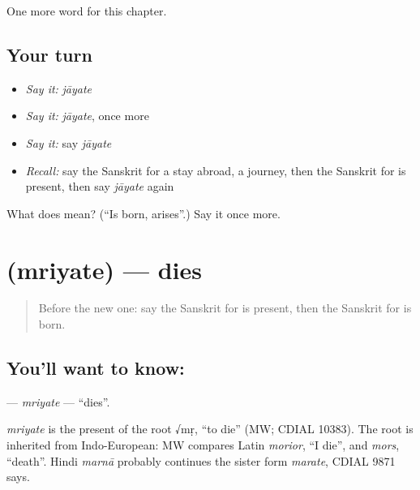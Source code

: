 \begin{grammarlens}[title={What you've built}]
One more word for this chapter.
\end{grammarlens}

\subsection*{Your turn}
\begin{itemize}
\raggedright
  \item \emph{Say it:} \emph{jāyate}
  \item \emph{Say it:} \emph{jāyate}, once more
  \item \emph{Say it:} say \emph{jāyate}
  \item \emph{Recall:} say the Sanskrit for a stay abroad, a journey, then the Sanskrit for is present, then say \emph{jāyate} again
\end{itemize}

\begin{tcolorbox}[breakable,colback=teal!4,colframe=teal!35!black,title={Before you move on}]
What does  mean? (\textquotedblleft{}Is born, arises\textquotedblright{}.) Say it once more.
\end{tcolorbox}
\section[\texorpdfstring{\sk{म्रियते} (mriyate)}{म्रियते (mriyate)}]{ (mriyate) — dies}

\label{lesson:SA-C232-mriyate}



\begin{quote}
Before the new one: say the Sanskrit for is present, then the Sanskrit for is born.
\end{quote}

\subsection*{You'll want to know: }
\textbf{} — \emph{mriyate} — \textquotedblleft{}dies\textquotedblright{}.

\begin{cousinweb}
\emph{mriyate} is the present of the root √mṛ, \textquotedblleft{}to die\textquotedblright{} (MW; CDIAL 10383). The root is inherited from Indo-European: MW compares Latin \emph{morior}, \textquotedblleft{}I die\textquotedblright{}, and \emph{mors}, \textquotedblleft{}death\textquotedblright{}. Hindi \emph{marnā} probably continues the sister form \emph{marate}, CDIAL 9871 says.
\end{cousinweb}

